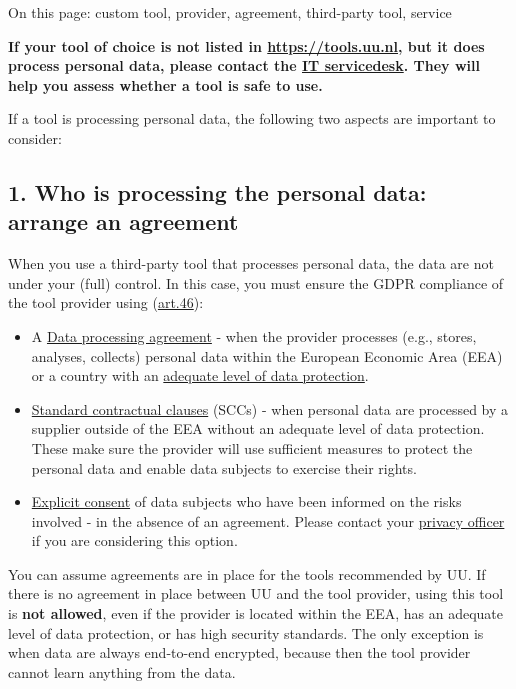 \documentclass[
]{book}
\providecommand{\tightlist}{%
  \setlength{\itemsep}{0pt}\setlength{\parskip}{0pt}}
\begin{document}
On this page: custom tool, provider, agreement, third-party tool, service

\textbf{If your tool of choice is not listed in \url{https://tools.uu.nl}, but it does
process personal data, please contact the
\href{https://www.uu.nl/en/organisation/information-and-technology-services-its/i-want-to/get-help-and-advice}{IT servicedesk}.
They will help you assess whether a tool is safe to use.}

If a tool is processing personal data, the following two aspects are important to consider:

\hypertarget{who-is-processing-the-personal-data-arrange-an-agreement}{%
\subsection{1. Who is processing the personal data: arrange an agreement}\label{who-is-processing-the-personal-data-arrange-an-agreement}}

When you use a third-party tool that processes personal data, the data are not
under your (full) control. In this case, you must ensure the GDPR compliance of
the tool provider using (\href{https://gdpr-info.eu/art-46-gdpr/}{art.46}):

\begin{itemize}
\tightlist
\item
  A \protect\hyperlink{data-processing-agreement}{Data processing agreement} -
  when the provider processes (e.g., stores, analyses, collects) personal data
  within the European Economic Area (EEA) or a country with an
  \href{https://ec.europa.eu/info/law/law-topic/data-protection/international-dimension-data-protection/adequacy-decisions_en}{adequate level of data protection}.
\item
  \protect\hyperlink{scc}{Standard contractual clauses} (SCCs) - when personal data are processed
  by a supplier outside of the EEA without an adequate level of data protection.
  These make sure the provider will use sufficient measures to protect the personal
  data and enable data subjects to exercise their rights.
\item
  \protect\hyperlink{informed-consent-forms}{Explicit consent} of data subjects who have been
  informed on the risks involved - in the absence of an agreement. Please contact your
  \protect\hyperlink{support}{privacy officer} if you are considering this option.
\end{itemize}

You can assume agreements are in place for the tools recommended by UU.
If there is no agreement in place between UU and the tool provider, using
this tool is \textbf{not allowed}, even if the provider is located within the EEA,
has an adequate level of data protection, or has high security standards. The
only exception is when data are always end-to-end encrypted, because then the
tool provider cannot learn anything from the data.
\end{document}
